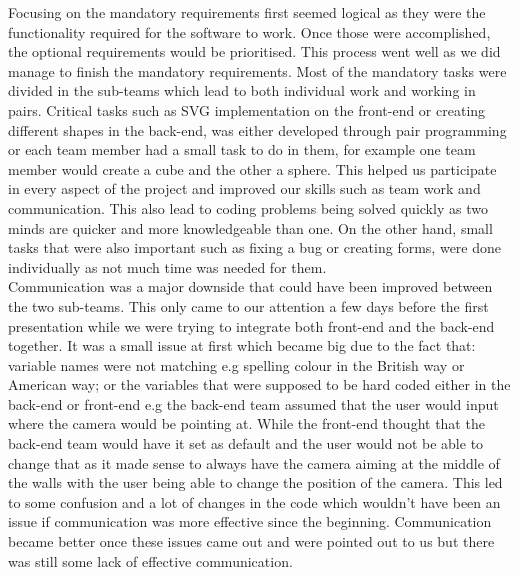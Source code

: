\documentclass[a4paper]{report}
\begin{document}
	Focusing on the mandatory requirements first seemed logical as they were the functionality required for the software to work. Once those were accomplished, the optional requirements would be prioritised. This process went well as we did manage to finish the mandatory requirements. Most of the mandatory tasks were divided in the sub-teams which lead to both individual work and working in pairs. Critical tasks such as SVG implementation on the front-end or creating different shapes in the back-end, was either developed through pair programming or each team member had a small task to do in them, for example one team member would create a cube and the other a sphere. This helped us participate in every aspect of the project and improved our skills such as  team work and communication. This also lead to  coding problems being solved quickly as two minds are quicker and more knowledgeable than one. On the other hand, small tasks that were also important such as fixing a bug or creating forms, were done individually as not much time was needed for them. \\
	
	Communication was a major downside that could have been improved between the two sub-teams. This only came to our attention a few days before the first presentation while we were trying to integrate both front-end and the back-end together. It was a small issue at first which became big due to the fact that: variable names were not matching e.g spelling colour in the British way or American way; or the variables that were supposed to be hard coded either in the back-end or front-end e.g the back-end team assumed that the user would input where the camera would be pointing at. While the front-end thought that the back-end team would have it set as default and the user would not be able to change that as it made sense to always have the camera aiming at the middle of the walls with the user being able to change the position of the camera. This led to some confusion and a lot of changes in the code which wouldn't have been an issue if communication was more effective since the beginning. Communication became better once these issues came out and were pointed out to us but there was still some lack of effective communication.\\
	
\end{document}
